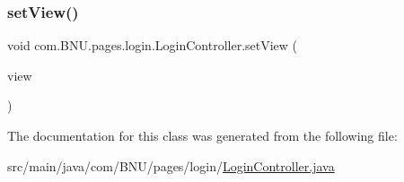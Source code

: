 \subsubsection{\texorpdfstring{set\+View()}{setView()}}
{\footnotesize\ttfamily void com.\+B\+N\+U.\+pages.\+login.\+Login\+Controller.\+set\+View (\begin{DoxyParamCaption}\item[{\mbox{\hyperlink{classcom_1_1_b_n_u_1_1pages_1_1login_1_1_login_view}{Login\+View}}}]{view }\end{DoxyParamCaption})}



The documentation for this class was generated from the following file\+:\begin{DoxyCompactItemize}
\item 
src/main/java/com/\+B\+N\+U/pages/login/\mbox{\hyperlink{_login_controller_8java}{Login\+Controller.\+java}}\end{DoxyCompactItemize}
